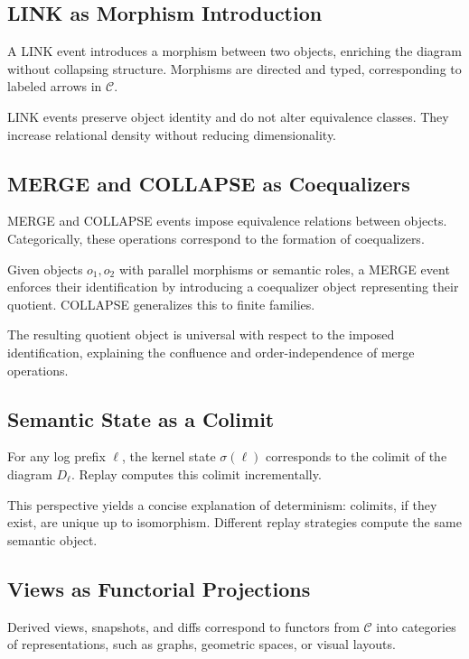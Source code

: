 \documentclass[11pt]{article}
\begin{document}
\subsection{LINK as Morphism Introduction}

A LINK event introduces a morphism between two objects, enriching the
diagram without collapsing structure. Morphisms are directed and typed,
corresponding to labeled arrows in $\mathcal{C}$.

LINK events preserve object identity and do not alter equivalence classes.
They increase relational density without reducing dimensionality.

\subsection{MERGE and COLLAPSE as Coequalizers}

MERGE and COLLAPSE events impose equivalence relations between objects.
Categorically, these operations correspond to the formation of
coequalizers.

Given objects $o_1, o_2$ with parallel morphisms or semantic roles, a MERGE
event enforces their identification by introducing a coequalizer object
representing their quotient. COLLAPSE generalizes this to finite families.

The resulting quotient object is universal with respect to the imposed
identification, explaining the confluence and order-independence of merge
operations.

\subsection{Semantic State as a Colimit}

For any log prefix $\ell$, the kernel state $\sigma(\ell)$ corresponds to
the colimit of the diagram $D_\ell$. Replay computes this colimit
incrementally.

This perspective yields a concise explanation of determinism: colimits, if
they exist, are unique up to isomorphism. Different replay strategies
compute the same semantic object.

\subsection{Views as Functorial Projections}

Derived views, snapshots, and diffs correspond to functors from
$\mathcal{C}$ into categories of representations, such as graphs,
geometric spaces, or visual layouts.
\end{document}
